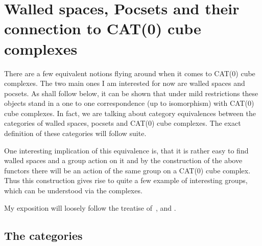 
\section{Walled spaces, Pocsets and their connection to CAT(0) cube complexes}
\label{sec:walls}

There are a few equivalent notions flying around when it comes to CAT(0) cube complexes. The two main ones I am interested for now are walled spaces and pocsets. As shall follow below, it can be shown that under mild restrictions these objects stand in a one to one correspondence (up to isomorphism) with CAT(0) cube complexes. In fact, we are talking about category equivalences between the categories of walled spaces, pocsets and CAT(0) cube complexes. The exact definition of these categories will follow suite.

One interesting implication of this equivalence is, that it is rather easy to find walled spaces and a group action on it and by the construction of the above functors there will be an action of the same group on a CAT(0) cube complex. Thus this construction gives rise to quite a few example of interesting groups, which can be understood via the complexes.

My exposition will loosely follow the treatise of~\textcite{Nica2004}, \textcite{MR1347406} and \textcite{Roller1999}.

\subsection{The categories}
\label{sec:cat}

